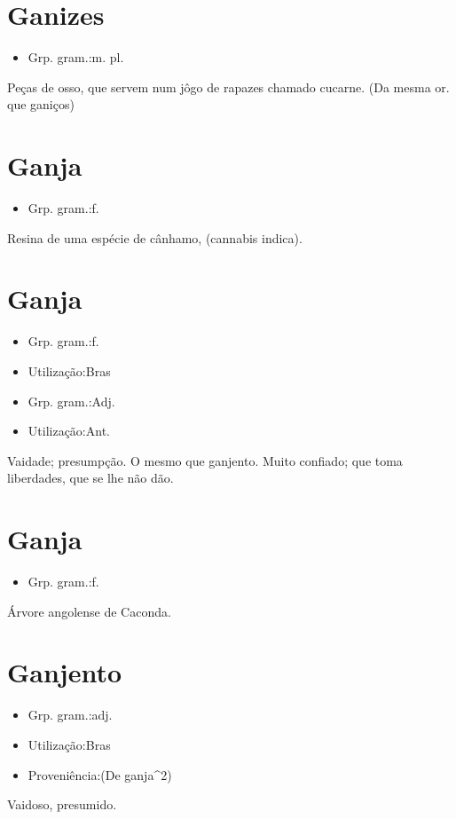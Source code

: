 \section{Ganizes}
\begin{itemize}
\item {Grp. gram.:m. pl.}
\end{itemize}
Peças de osso, que servem num jôgo de rapazes chamado cucarne.
(Da mesma or. que \textunderscore ganiços\textunderscore )
\section{Ganja}
\begin{itemize}
\item {Grp. gram.:f.}
\end{itemize}
Resina de uma espécie de cânhamo, (\textunderscore cannabis indica\textunderscore ).
\section{Ganja}
\begin{itemize}
\item {Grp. gram.:f.}
\end{itemize}
\begin{itemize}
\item {Utilização:Bras}
\end{itemize}
\begin{itemize}
\item {Grp. gram.:Adj.}
\end{itemize}
\begin{itemize}
\item {Utilização:Ant.}
\end{itemize}
Vaidade; presumpção.
O mesmo que \textunderscore ganjento\textunderscore .
Muito confiado; que toma liberdades, que se lhe não dão.
\section{Ganja}
\begin{itemize}
\item {Grp. gram.:f.}
\end{itemize}
Árvore angolense de Caconda.
\section{Ganjento}
\begin{itemize}
\item {Grp. gram.:adj.}
\end{itemize}
\begin{itemize}
\item {Utilização:Bras}
\end{itemize}
\begin{itemize}
\item {Proveniência:(De \textunderscore ganja\textunderscore ^2)}
\end{itemize}
Vaidoso, presumido.
